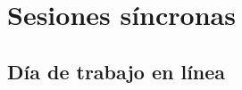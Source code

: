\documentclass[12pt]{beamer}
\begin{document}

\section{Sesiones síncronas}
\subsection{Día de trabajo en línea}
\end{document}
